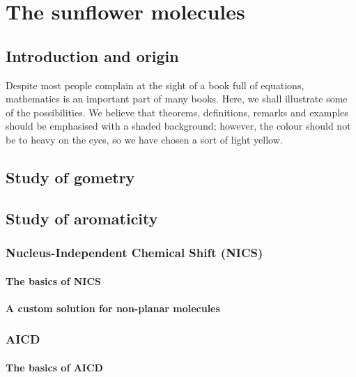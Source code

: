 \setchapterpreamble[u]{\margintoc}
\chapter{The sunflower molecules}


\section{Introduction and origin}

Despite most people complain at the sight of a book full of equations,
mathematics is an important part of many books. Here, we shall
illustrate some of the possibilities. We believe that theorems,
definitions, remarks and examples should be emphasised with a shaded
background; however, the colour should not be to heavy on the eyes, so
we have chosen a sort of light yellow.


\section{Study of gometry}

\blindtext


\section{Study of aromaticity}

\subsection{Nucleus-Independent Chemical Shift (NICS)}
\subsubsection{The basics of NICS}
\subsubsection{A custom solution for non-planar molecules}

\subsection{AICD}
\subsubsection{The basics of AICD}
